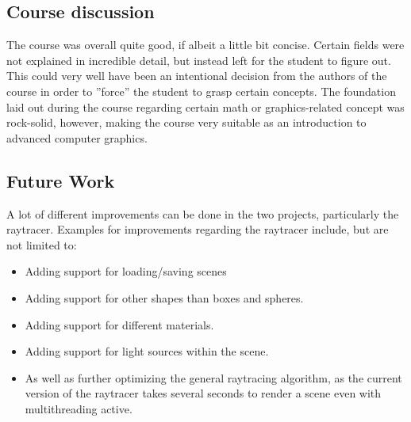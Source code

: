 \subsection{Course discussion}

The course was overall quite good, if albeit a little bit concise. Certain fields were not explained in incredible detail, but instead left for the student to figure out. This could very well have been an intentional decision from the authors of the course in order to ''force'' the student to grasp certain concepts. The foundation laid out during the course regarding certain math or graphics-related concept was rock-solid, however, making the course very suitable as an introduction to advanced computer graphics.

\subsection{Future Work}
\label{ch:concl:future-work}

A lot of different improvements can be done in the two projects, particularly the raytracer. Examples for improvements regarding the raytracer include, but are not limited to:

\begin{itemize}
	\item Adding support for loading/saving scenes
	\item Adding support for other shapes than boxes and spheres.
	\item Adding support for different materials.
	\item Adding support for light sources within the scene.
	\item As well as further optimizing the general raytracing algorithm, as the current version of the raytracer takes several seconds to render a scene even with multithreading active.
\end{itemize}
